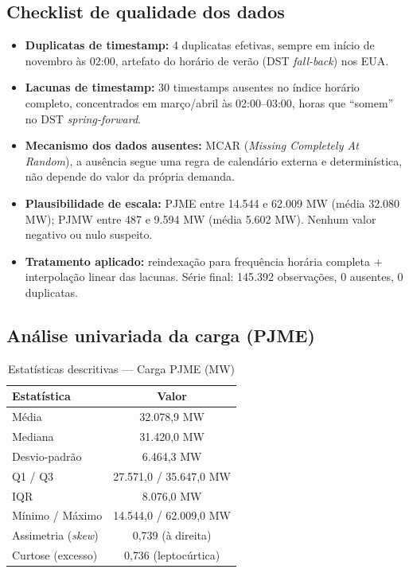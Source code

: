 \documentclass[12pt,a4paper]{article}
\begin{document}
\subsection{Checklist de qualidade dos dados}

\begin{itemize}
    \item \textbf{Duplicatas de timestamp:} 4 duplicatas efetivas, sempre em início de novembro às 02:00, artefato do horário de verão (DST \emph{fall-back}) nos EUA.
    \item \textbf{Lacunas de timestamp:} 30 timestamps ausentes no índice horário completo, concentrados em março/abril às 02:00--03:00, horas que ``somem'' no DST \emph{spring-forward}.
    \item \textbf{Mecanismo dos dados ausentes:} MCAR (\emph{Missing Completely At Random}), a ausência segue uma regra de calendário externa e determinística, não depende do valor da própria demanda.
    \item \textbf{Plausibilidade de escala:} PJME entre 14.544 e 62.009 MW (média 32.080 MW); PJMW entre 487 e 9.594 MW (média 5.602 MW). Nenhum valor negativo ou nulo suspeito.
    \item \textbf{Tratamento aplicado:} reindexação para frequência horária completa + interpolação linear das lacunas. Série final: 145.392 observações, 0 ausentes, 0 duplicatas.
\end{itemize}

\subsection{Análise univariada da carga (PJME)}

\begin{table}[H]
\centering
\caption{Estatísticas descritivas --- Carga PJME (MW)}
\begin{tabular}{lc}
\toprule
Estatística & Valor \\
\midrule
Média              & 32.078,9 MW \\
Mediana            & 31.420,0 MW \\
Desvio-padrão      & 6.464,3 MW \\
Q1 / Q3            & 27.571,0 / 35.647,0 MW \\
IQR                & 8.076,0 MW \\
Mínimo / Máximo    & 14.544,0 / 62.009,0 MW \\
Assimetria (\emph{skew}) & 0{,}739 (à direita) \\
Curtose (excesso)  & 0{,}736 (leptocúrtica) \\
\bottomrule
\end{tabular}
\end{table}
\end{document}
